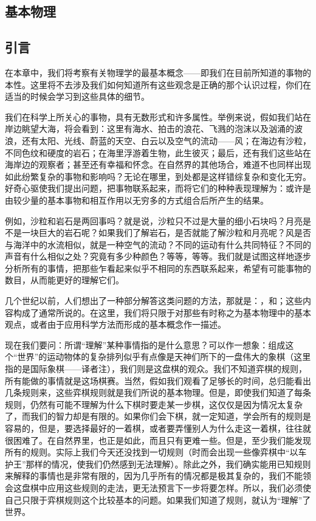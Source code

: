 \documentclass[12pt,oneside]{book}
\begin{document}
\begin{common-format}
\chapter{基本物理}
\section{引言}
在本章中，我们将考察有关物理学的最基本概念——即我们在目前所知道的事物的本性。这里将不去涉及我们如何知道所有这些观念是正确的那个认识过程，你们在适当的时候会学习到这些具体的细节。

我们在科学上所关心的事物，具有无数形式和许多属性。举例来说，假如我们站在岸边眺望大海，将会看到：这里有海水、拍击的浪花、飞溅的泡沫以及汹涌的波浪，还有太阳、光线、蔚蓝的天空、白云以及空气的流动——风；在海边有沙粒，不同色纹和硬度的岩石；在海里浮游着生物，此生彼灭；最后，还有我们这些站在海岸边的观察者；甚至还有幸福和怀念。在自然界的其他场合，难道不也同样出现如此纷繁复杂的事物和影响吗？无论在哪里，到处都是这样错综复杂和变化无穷。好奇心驱使我们提出问题，把事物联系起来，而将它们的种种表现理解为：或许是由较少量的基本事物和相互作用以无穷多的方式组合后所产生的结果。

例如，沙粒和岩石是两回事吗？就是说，沙粒只不过是大量的细小石块吗？月亮是不是一块巨大的岩石呢？如果我们了解岩石，是否就能了解沙粒和月亮呢？风是否与海洋中的水流相似，就是一种空气的流动？不同的运动有什么共同特征？不同的声音有什么相似之处？究竟有多少种颜色？等等，等等。我们就是试图这样地逐步分析所有的事情，把那些乍看起来似乎不相同的东西联系起来，希望有可能事物的数目，从而能更好的理解它们。

几个世纪以前，人们想出了一种部分解答这类问题的方法，那就是：，和；这些内容构成了通常所说的。在这里，我们将只限于对那些有时称之为基本物理中的基本观点，或者由于应用科学方法而形成的基本概念作一描述。

现在我们要问：所谓“理解”某种事情指的是什么意思？可以作一想象：组成这个“世界”的运动物体的复杂排列似乎有点像是天神们所下的一盘伟大的象棋（这里指的是国际象棋——译者注），我们则是这盘棋的观众。我们不知道弈棋的规则，所有能做的事情就是这场棋赛。当然，假如我们观看了足够长的时间，总归能看出几条规则来，这些弈棋规则就是我们所说的基本物理。但是，即使我们知道了每条规则，仍然有可能不理解为什么下棋时要走某一步棋，这仅仅是因为情况太复杂了，而我们的智力却是有限的。如果你们会下棋，就一定知道，学会所有的规则是容易的，但是，要选择最好的一着棋，或者要弄懂别人为什么走这一着棋，往往就很困难了。在自然界里，也正是如此，而且只有更难一些。但是，至少我们能发现所有的规则。实际上我们今天还没找到一切规则（时而会出现一些像弈棋中“以车护王”那样的情况，使我们仍然感到无法理解）。除此之外，我们确实能用已知规则来解释的事情也是非常有限的，因为几乎所有的情况都是极其复杂的，我们不能领会这盘棋中应用这些规则的走法，更无法预言下一步将要怎样。所以，我们必须使自己只限于弈棋规则这个比较基本的问题。如果我们知道了规则，就认为“理解”了世界。


\end{common-format}
\end{document}
